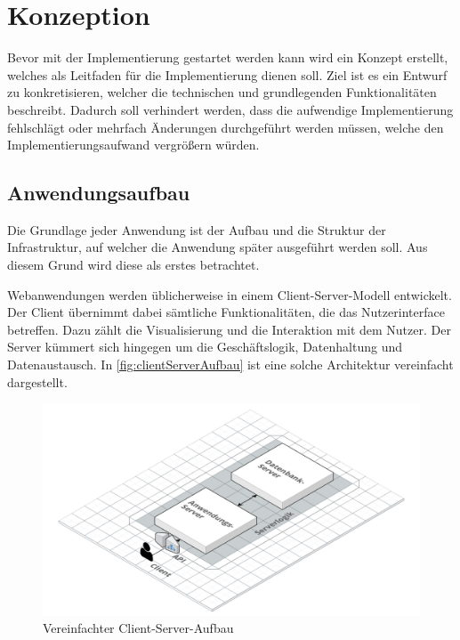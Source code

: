 \chapter{Konzeption}
Bevor mit der Implementierung gestartet werden kann wird ein Konzept erstellt, welches als Leitfaden für die Implementierung dienen soll.
Ziel ist es ein Entwurf zu konkretisieren, welcher die technischen und grundlegenden Funktionalitäten beschreibt.
Dadurch soll verhindert werden, dass die aufwendige Implementierung fehlschlägt oder mehrfach Änderungen durchgeführt werden müssen, welche den Implementierungsaufwand vergrößern würden.


\section{Anwendungsaufbau}
Die Grundlage jeder Anwendung ist der Aufbau und die Struktur der Infrastruktur, auf welcher die Anwendung später ausgeführt werden soll.
Aus diesem Grund wird diese als erstes betrachtet.

Webanwendungen werden üblicherweise in einem Client-Server-Modell entwickelt.
Der Client übernimmt dabei sämtliche Funktionalitäten, die das Nutzerinterface betreffen.
Dazu zählt die Visualisierung und die Interaktion mit dem Nutzer.
Der Server kümmert sich hingegen um die Geschäftslogik, Datenhaltung und Datenaustausch.
In \autoref{fig:clientServerAufbau} ist eine solche Architektur vereinfacht dargestellt.


\begin{figure}[h]
    \centering
    \includegraphics[width=.9\textwidth]{img/ClientServer.png}
    \caption{Vereinfachter Client-Server-Aufbau}
    \label{fig:clientServerAufbau}
\end{figure}

